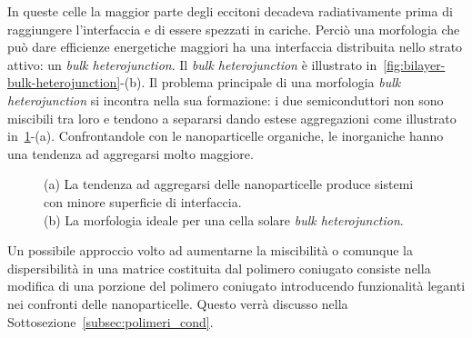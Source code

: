 In queste celle la maggior parte degli eccitoni decadeva radiativamente prima di raggiungere l'interfaccia e di essere spezzati in cariche. Perciò una morfologia che può dare efficienze energetiche maggiori ha una interfaccia distribuita nello strato attivo: un \emph{bulk heterojunction}. Il \emph{bulk heterojunction} è illustrato in~\ref{fig:bilayer-bulk-heterojunction}-(b).
Il problema principale di una morfologia \emph{bulk heterojunction} si incontra nella sua formazione: i due semiconduttori non sono miscibili tra loro e tendono a separarsi dando estese aggregazioni come illustrato in~\ref{fig:interconnessi-allineati}-(a). Confrontandole con le nanoparticelle organiche, le inorganiche hanno una tendenza ad aggregarsi molto maggiore.
\setlength{\captionmargin}{.05\textwidth}  
\begin{figure}[!htb]
\caption{\footnotesize{(a) La tendenza ad aggregarsi delle nanoparticelle produce sistemi con minore superficie di interfaccia. \\(b) La morfologia ideale per una cella solare \emph{bulk heterojunction}. }}
\label{fig:interconnessi-allineati}
\end{figure}
\setlength{\captionmargin}{.10\textwidth} 

Un possibile approccio volto ad aumentarne la miscibilità o comunque la dispersibilità in una matrice costituita dal polimero coniugato consiste nella modifica di una porzione del polimero coniugato introducendo funzionalità leganti nei confronti delle nanoparticelle. Questo verrà discusso nella Sottosezione~\ref{subsec:polimeri_cond}.

